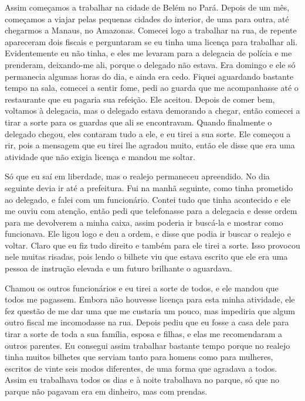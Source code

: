 Assim começamos a trabalhar na cidade de Belém no Pará. Depois de um
mês, começamos a viajar pelas pequenas cidades do interior, de uma para
outra, até chegarmos a Manaus, no Amazonas. Comecei logo a trabalhar na
rua, de repente apareceram dois fiscais e perguntaram se eu tinha uma
licença para trabalhar ali. Evidentemente eu não tinha, e eles me
levaram para a delegacia de polícia e me prenderam, deixando-me ali,
porque o delegado não estava. Era domingo e ele só permanecia algumas
horas do dia, e ainda era cedo. Fiquei aguardando bastante tempo na
sala, comecei a sentir fome, pedi ao guarda que me acompanhasse até o
restaurante que eu pagaria sua refeição. Ele aceitou. Depois de comer
bem, voltamos à delegacia, mas o delegado estava demorando a chegar,
então comecei a tirar a sorte para os guardas que ali se encontravam.
Quando finalmente o delegado chegou, eles contaram tudo a ele, e eu
tirei a sua sorte. Ele começou a rir, pois a mensagem que eu tirei lhe
agradou muito, então ele disse que era uma atividade que não exigia
licença e mandou me soltar.

Só que eu saí em liberdade, mas o realejo permaneceu apreendido. No dia
seguinte devia ir até a prefeitura. Fui na manhã seguinte, como tinha
prometido ao delegado, e falei com um funcionário. Contei tudo que tinha
acontecido e ele me ouviu com atenção, então pedi que telefonasse para a
delegacia e desse ordem para me devolverem a minha caixa, assim poderia
ir buscá-la e mostrar como funcionava. Ele ligou logo e deu a ordem, e
disse que podia ir buscar o realejo e voltar. Claro que eu fiz tudo
direito e também para ele tirei a sorte. Isso provocou nele muitas
risadas, pois lendo o bilhete viu que estava escrito que ele era uma
pessoa de instrução elevada e um futuro brilhante o aguardava.

Chamou os outros funcionários e eu tirei a sorte de todos, e ele mandou
que todos me pagassem. Embora não houvesse licença para esta minha
atividade, ele fez questão de me dar uma que me custaria um pouco, mas
impediria que algum outro fiscal me incomodasse na rua. Depois pediu que
eu fosse a casa dele para tirar a sorte de toda a sua família, esposa e
filhas, e elas me recomendaram a outros parentes. Eu consegui assim
trabalhar bastante tempo porque no realejo tinha muitos bilhetes que
serviam tanto para homens como para mulheres, escritos de vinte seis
modos diferentes, de uma forma que agradava a todos. Assim eu trabalhava
todos os dias e à noite trabalhava no parque, só que no parque não
pagavam era em dinheiro, mas com prendas.

